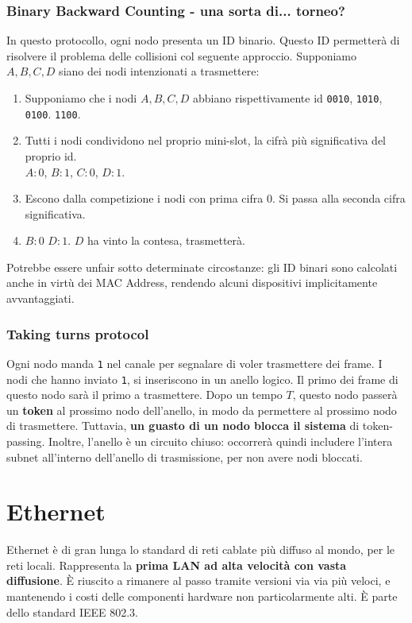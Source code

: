 \subsubsection{Binary Backward Counting - una sorta di... torneo?}
In questo protocollo, ogni nodo presenta un ID binario. Questo ID permetterà di risolvere il problema delle collisioni col seguente approccio. Supponiamo $A,B,C,D$ siano dei nodi intenzionati a trasmettere:
\begin{enumerate}
	\item Supponiamo che i nodi $A,B,C,D$ abbiano rispettivamente id \verb|0010|, \verb|1010|, \verb|0100|. \verb|1100|.
	\item Tutti i nodi condividono nel proprio mini-slot, la cifrà più significativa del proprio id.\\
	$A:0$, $B:1$, $C:0$, $D:1$.
	\item Escono dalla competizione i nodi con prima cifra 0. Si passa alla seconda cifra significativa.
	\item $B:0$ $D:1$. $D$ ha vinto la contesa, trasmetterà.
\end{enumerate}

Potrebbe essere unfair sotto determinate circostanze: gli ID binari sono calcolati anche in virtù dei MAC Address, rendendo alcuni dispositivi implicitamente avvantaggiati.

\newpage

\subsubsection{Taking turns protocol}
Ogni nodo manda \verb|1| nel canale per segnalare di voler trasmettere dei frame. I nodi che hanno inviato \verb|1|, si inseriscono in un anello logico. Il primo dei frame di questo nodo sarà il primo a trasmettere. Dopo un tempo $T$, questo nodo passerà un \textbf{token} al prossimo nodo dell'anello, in modo da permettere al prossimo nodo di trasmettere. Tuttavia, \textbf{un guasto di un nodo blocca il sistema} di token-passing. Inoltre, l'anello è un circuito chiuso: occorrerà quindi includere l'intera subnet all'interno dell'anello di trasmissione, per non avere nodi bloccati.

\newpage

\section{Ethernet}
Ethernet è di gran lunga lo standard di reti cablate più diffuso al mondo, per le reti locali. Rappresenta la \textbf{prima LAN ad alta velocità con vasta diffusione}. È riuscito a rimanere al passo tramite versioni via via più veloci, e mantenendo i costi delle componenti hardware non particolarmente alti. È parte dello standard IEEE 802.3.

